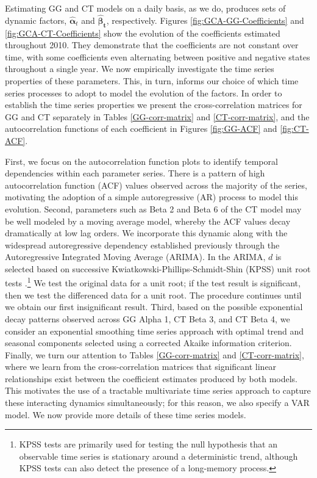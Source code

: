 \documentclass[12pt,a4paper]{article}
\begin{document}
Estimating GG and CT models on a daily basis, as we do, produces sets of dynamic factors, $\widehat{\boldsymbol{\alpha}}_{t}$ and $\bm{\widehat{\beta}}_{\boldsymbol{t}}$, respectively. Figures \ref{fig:GCA-GG-Coefficients} and \ref{fig:GCA-CT-Coefficients} show the evolution of the coefficients estimated throughout 2010. They demonstrate that the coefficients are not constant over time, with some coefficients even alternating between positive and negative states throughout a single year. We now empirically investigate the time series properties of these parameters. This, in turn, informs our choice of which time series processes to adopt to model the evolution of the factors. In order to establish the time series properties we present the cross-correlation matrices for GG and CT separately in Tables \ref{GG-corr-matrix} and \ref{CT-corr-matrix}, and the autocorrelation functions of each coefficient in Figures \ref{fig:GG-ACF} and \ref{fig:CT-ACF}.

First, we focus on the autocorrelation function plots to identify temporal dependencies within each parameter series. There is a pattern of high autocorrelation function (ACF) values observed across the majority of the series, motivating the adoption of a simple autoregressive (AR) process to model this evolution. Second, parameters such as Beta 2 and Beta 6 of the CT model may be well modeled by a moving average model, whereby the ACF values decay dramatically at low lag orders. We incorporate this dynamic along with the widespread autoregressive dependency established previously through the Autoregressive Integrated Moving Average (ARIMA). In the ARIMA, $d$ is selected based on successive Kwiatkowski-Phillips-Schmidt-Shin (KPSS) unit root tests \citep{KPSS92}.\footnote{KPSS tests are primarily used for testing the null hypothesis that an observable time series is stationary around a deterministic trend, although KPSS tests can also detect the presence of a long-memory process.} We test the original data for a unit root; if the test result is significant, then we test the differenced data for a unit root. The procedure continues until we obtain our first insignificant result. Third, based on the possible exponential decay patterns observed across GG Alpha 1, CT Beta 3, and CT Beta 4, we consider an exponential smoothing time series approach with optimal trend and seasonal components selected using a corrected Akaike information criterion. Finally, we turn our attention to Tables \ref{GG-corr-matrix} and \ref{CT-corr-matrix}, where we learn from the cross-correlation matrices that significant linear relationships exist between the coefficient estimates produced by both models. This motivates the use of a tractable multivariate time series approach to capture these interacting dynamics simultaneously; for this reason, we also specify a VAR model. We now provide more details of these time series models.
\end{document}
